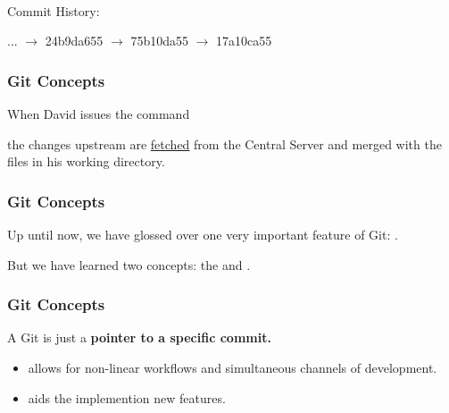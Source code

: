 \begin{frame}[t,fragile]
\begin{center}
\begin{figure}[h!]
{{
        }	
			         } \         
		\end{figure}
	\end{center}

	Commit History:

	... $\rightarrow$ \colorbox{black!30}{24b9da655} $\rightarrow$ \colorbox{black!30}{75b10da55} $\rightarrow$ \colorbox{black!30}{17a10ca55}

\end{frame}

\begin{frame}[c]\frametitle{Git Concepts}
	When David issues the command 

	\vspace{0.5cm}

	\vspace{0.5cm}
	the changes upstream are \href{http://git-scm.com/book/en/Git-Basics-Working-with-Remotes}{fetched} from the Central Server and 
	merged with the files in his working directory.
\end{frame}

\begin{frame}[c]\frametitle{Git Concepts}
	Up until now, we have glossed over one very important feature
	of Git: . 

	\vspace{1cm}
	But we have learned two concepts: 
	the  and 
	. 
\end{frame}

\begin{frame}[c]\frametitle{Git Concepts}
	A Git  is just a
	\textbf{pointer to a specific commit.}

	\begin{itemize}
		\item allows for non-linear workflows
		and simultaneous channels of development.
		\item aids the implemention new features.
	\end{itemize}

\end{frame}

